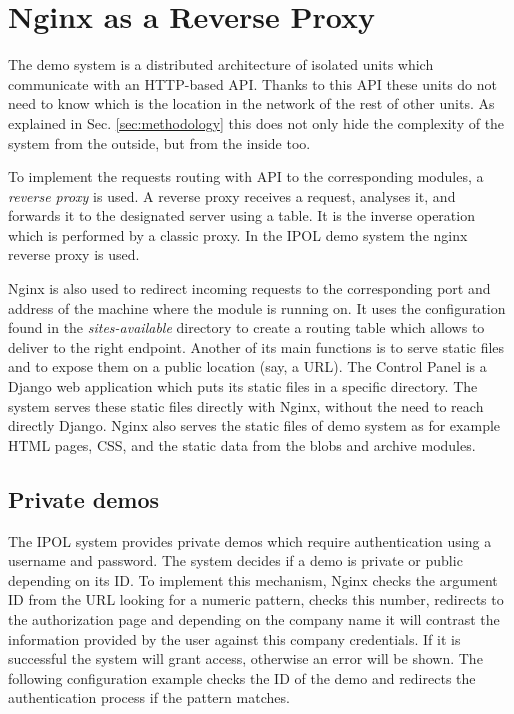 
\section{Nginx as a Reverse Proxy}
\label{sec:reverse_proxy}

The demo system is a distributed architecture of isolated units which communicate with an HTTP-based API. Thanks to this API these
units do not need to know which is the location in the network of the rest of other units. As explained in Sec. \ref{sec:methodology} this
does not only hide the complexity of the system from the outside, but from the inside too.

To implement the requests routing with API to the corresponding modules, a \emph{reverse proxy} is used. A reverse proxy receives a
request, analyses it, and forwards it to the designated server using a table. It is the inverse operation which is performed by a
classic proxy. In the IPOL demo system the nginx reverse proxy is used.

Nginx is also used to redirect incoming requests to the corresponding port and address of the machine where the module is 
running on. It uses the configuration found in the \emph{sites-available} directory to create a routing table which allows to deliver to the right endpoint.
Another of its main functions is to serve static files and to expose them on a public location (say, a URL). The Control Panel is a Django web application which puts its static files in a specific directory. 
The system serves these static files directly with Nginx, without the need to reach directly Django. Nginx also serves the static files of demo system as for example HTML pages, CSS, and the static data from the blobs and archive modules.

\subsection{Private demos}
The IPOL system provides private demos which require authentication using a username and password. The system decides if a demo is private or public depending on its ID. To implement this mechanism, Nginx checks the argument ID from the URL looking for a numeric pattern, checks this number, redirects to the authorization page and depending on the company name it will contrast the information provided by the user against this company credentials. If it is successful the system will grant access, otherwise an error will be shown. The following configuration example checks the ID of the
demo and redirects the authentication process if the pattern matches.

